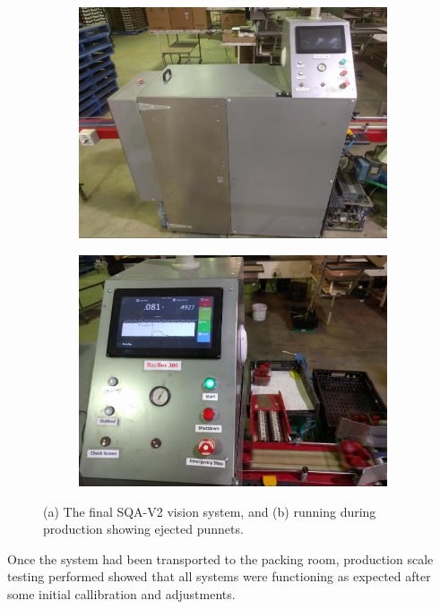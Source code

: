 \documentclass[fleqn,twoside]{article}
\begin{document}
\begin{figure}[t]
	\centering
	\begin{subfigure}{0.5\textwidth}
		\centering
		\includegraphics[width=0.95\linewidth]{SQA2_complete.jpg}
		\caption{}
		\label{fig:SQA2_complete}
	\end{subfigure}%
	\begin{subfigure}{0.5\textwidth}
		\centering
		\includegraphics[width=0.95\linewidth]{action_shot.jpg}
		\caption{}
		\label{fig:action_shot}
	\end{subfigure}%
	\caption{(a) The final SQA-V2 vision system, and (b) running during production showing ejected punnets.}
	\label{}
\end{figure}

Once the system had been transported to the packing room, production scale testing performed showed that all systems were functioning as expected after some initial callibration and adjustments. 
\end{document}
